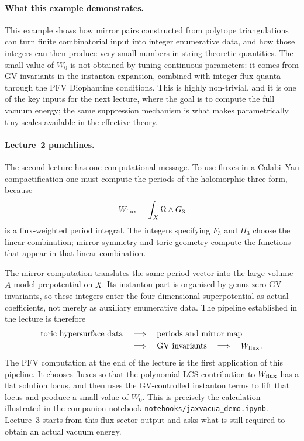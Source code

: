 \paragraph{What this example demonstrates.}
This example shows how mirror pairs constructed from polytope
triangulations can turn finite combinatorial input into integer
enumerative data, and how those integers can then produce very small
numbers in string-theoretic quantities.  The small value of
$W_0$ is not obtained by tuning continuous parameters: it comes from
GV invariants in the instanton expansion, combined with integer flux
quanta through the PFV Diophantine conditions.  This is highly
non-trivial, and it is one of the key inputs for the next lecture,
where the goal is to compute the full vacuum energy; the same
suppression mechanism is what makes parametrically tiny scales
available in the effective theory.



\paragraph{Lecture~2 punchlines.}
The second lecture has one computational message.  To use
fluxes in a Calabi--Yau compactification one must compute the periods
of the holomorphic three-form, because
\begin{equation}
    W_{\rm flux}=\int_X\Omega\wedge G_3
\end{equation}
is a flux-weighted period integral.  The integers specifying
$F_3$ and $H_3$ choose the linear combination; mirror symmetry and
toric geometry compute the functions that appear in that linear
combination.

The mirror computation translates the same period vector
into the large volume $A$-model prepotential on $\widetilde X$.  Its
instanton part is organised by genus-zero GV invariants,
so these integers enter the four-dimensional superpotential as
actual coefficients, not merely as auxiliary enumerative data.  The
pipeline established in the lecture is therefore
\begin{equation}
\begin{aligned}
    \text{toric hypersurface data}
    &\quad\Longrightarrow\quad
    \text{periods and mirror map}\\
    &\quad\Longrightarrow\quad
    \text{GV invariants}
    \quad\Longrightarrow\quad
    W_{\rm flux}\, .
\end{aligned}
\end{equation}
The PFV computation at the end of the lecture is the first
application of this pipeline.  It chooses fluxes so that the
polynomial LCS contribution to $W_{\rm flux}$ has a flat solution
locus, and then uses the GV-controlled instanton terms to lift that
locus and produce a small value of $W_0$.  This is precisely the
calculation illustrated in the companion notebook
\texttt{notebooks/jaxvacua\_demo.ipynb}.  Lecture~3 starts from this
flux-sector output and asks what is still required to obtain an
actual vacuum energy.
